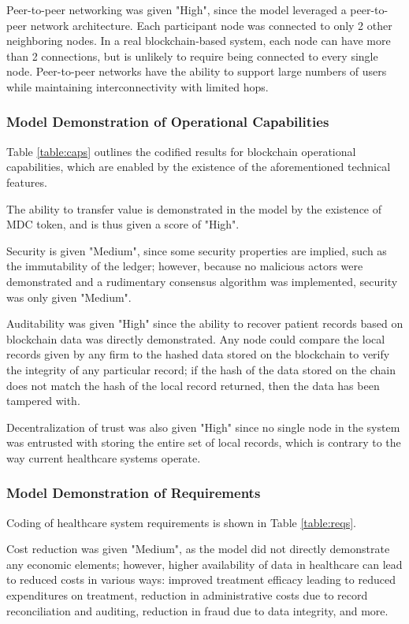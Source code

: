 \documentclass[12pt]{report}
\begin{document}
Peer-to-peer networking was given "High", since the model leveraged a peer-to-peer network architecture. Each participant node was connected to only 2 other neighboring nodes. In a real blockchain-based system, each node can have more than 2 connections, but is unlikely to require being connected to every single node. Peer-to-peer networks have the ability to support large numbers of users while maintaining interconnectivity with limited hops.

\subsubsection{Model Demonstration of Operational Capabilities}
Table \ref{table:caps} outlines the codified results for blockchain operational capabilities, which are enabled by the existence of the aforementioned technical features. 

The ability to transfer value is demonstrated in the model by the existence of MDC token, and is thus given a score of "High". 

Security is given "Medium", since some security properties are implied, such as the immutability of the ledger; however, because no malicious actors were demonstrated and a rudimentary consensus algorithm was implemented, security was only given "Medium".
 
Auditability was given "High" since the ability to recover patient records based on blockchain data was directly demonstrated. Any node could compare the local records given by any firm to the hashed data stored on the blockchain to verify the integrity of any particular record; if the hash of the data stored on the chain does not match the hash of the local record returned, then the data has been tampered with.
 
Decentralization of trust was also given "High" since no single node in the system was entrusted with storing the entire set of local records, which is contrary to the way current healthcare systems operate. 

\subsubsection{Model Demonstration of Requirements}
Coding of healthcare system requirements is shown in Table \ref{table:reqs}. 

Cost reduction was given "Medium", as the model did not directly demonstrate any economic elements; however, higher availability of data in healthcare can lead to reduced costs in various ways: improved treatment efficacy leading to reduced expenditures on treatment, reduction in administrative costs due to record reconciliation and auditing, reduction in fraud due to data integrity, and more.
\end{document}
